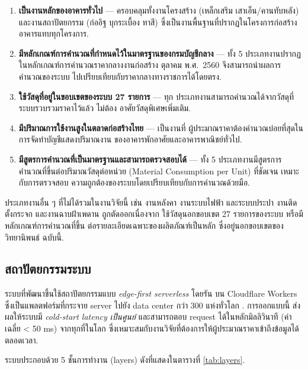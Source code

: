 \begin{enumerate}[leftmargin=2em,itemsep=0.3em]
  \item \textbf{เป็นงานหลักของอาคารทั่วไป} --- ครอบคลุมทั้งงานโครงสร้าง
        (เหล็กเสริม เสาเอ็น/คานทับหลัง) และงานสถาปัตยกรรม (ก่ออิฐ
        บุกระเบื้อง ทาสี) ซึ่งเป็นงานพื้นฐานที่ปรากฏในโครงการก่อสร้าง
        อาคารแทบทุกโครงการ.
  \item \textbf{มีหลักเกณฑ์การคำนวณที่กำหนดไว้ในมาตรฐานของกรมบัญชีกลาง}
        --- ทั้ง 5 ประเภทงานปรากฏในหลักเกณฑ์การคำนวณราคากลางงานก่อสร้าง
        ตุลาคม พ.ศ.\ 2560 \cite{cgd2569} จึงสามารถนำผลการคำนวณของระบบ
        ไปเปรียบเทียบกับราคากลางทางราชการได้โดยตรง.
  \item \textbf{ใช้วัสดุที่อยู่ในขอบเขตของระบบ 27 รายการ} --- ทุก
        ประเภทงานสามารถคำนวณได้จากวัสดุที่ระบบรวบรวมราคาไว้แล้ว ไม่ต้อง
        อาศัยวัสดุพิเศษเพิ่มเติม.
  \item \textbf{มีปริมาณการใช้งานสูงในตลาดก่อสร้างไทย} --- เป็นงานที่
        ผู้ประมาณราคาต้องคำนวณบ่อยที่สุดในการจัดทำบัญชีแสดงปริมาณงาน
        ของอาคารพักอาศัยและอาคารพาณิชย์ทั่วไป.
  \item \textbf{มีสูตรการคำนวณที่เป็นมาตรฐานและสามารถตรวจสอบได้} ---
        ทั้ง 5 ประเภทงานมีสูตรการคำนวณที่ขึ้นต่อปริมาณวัสดุต่อหน่วย
        (Material Consumption per Unit) ที่ชัดเจน เหมาะกับการตรวจสอบ
        ความถูกต้องของระบบโดยเปรียบเทียบกับการคำนวณด้วยมือ.
\end{enumerate}

ประเภทงานอื่น ๆ ที่ไม่ได้รวมในงานวิจัยนี้ เช่น งานหลังคา งานระบบไฟฟ้า
และระบบประปา งานติดตั้งกระจก และงานฉาบฝ้าเพดาน ถูกตัดออกเนื่องจาก
ใช้วัสดุนอกขอบเขต 27 รายการของระบบ หรือมีหลักเกณฑ์การคำนวณที่ขึ้น
ต่อรายละเอียดเฉพาะของผลิตภัณฑ์เป็นหลัก ซึ่งอยู่นอกขอบเขตของวิทยานิพนธ์
ฉบับนี้.

\subsection{สถาปัตยกรรมระบบ}

ระบบที่พัฒนาขึ้นใช้สถาปัตยกรรมแบบ \emph{edge-first serverless} โดยรัน
บน Cloudflare Workers ซึ่งเป็นแพลตฟอร์มที่กระจาย server ไปยัง
data center กว่า 300 แห่งทั่วโลก \cite{cloudflare2025}. การออกแบบนี้
ส่งผลให้ระบบมี \emph{cold-start latency เป็นศูนย์} และสามารถตอบ
request ได้ในหลักมิลลิวินาที (ค่าเฉลี่ย < 50 ms) จากทุกที่ในโลก
ซึ่งเหมาะสมกับงานวิจัยที่ต้องการให้ผู้ประมาณราคาเข้าถึงข้อมูลได้
ตลอดเวลา.

ระบบประกอบด้วย 5 ชั้นการทำงาน (layers) ดังที่แสดงในตารางที่
\ref{tab:layers}.

